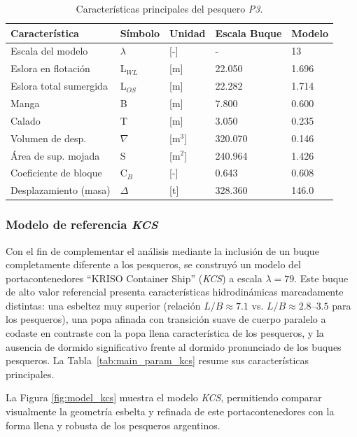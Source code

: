 \begin{table}[htbp]
\centering
\caption{Características principales del pesquero \textit{P3}.}
\label{tab:main_param_p3}
\begin{tabularx}{\textwidth}{lllll}
\toprule
\textbf{Característica}&\textbf{Símbolo}&\textbf{Unidad} & \textbf{Escala Buque} & \textbf{Modelo}\\
\midrule
Escala del modelo & $\lambda$ & {[}-{]} & - & 13 \\
Eslora en flotación & L$_{WL}$ & {[}m{]} & 22.050 & 1.696 \\
Eslora total sumergida & L$_{OS}$ & {[}m{]} & 22.282 & 1.714 \\
Manga & B & {[}m{]} & 7.800 & 0.600 \\
Calado & T & {[}m{]} & 3.050 & 0.235 \\
Volumen de desp. & $\nabla$ & {[}m$^3${]} & 320.070 & 0.146 \\
Área de sup. mojada & S & {[}m$^2${]} & 240.964 & 1.426 \\
Coeficiente de bloque & C$_B$ & {[}-{]} & 0.643 & 0.608 \\
Desplazamiento (masa) & $\Delta$ & {[}t{]} & 328.360 & 146.0 \\
\bottomrule
\end{tabularx}
\end{table}


\subsubsection{Modelo de referencia \textit{KCS}}
Con el fin de complementar el análisis mediante la inclusión de un buque completamente diferente a los pesqueros, se construyó un modelo del portacontenedores ``KRISO Container Ship'' (\textit{KCS}) a escala $\lambda = 79$. Este buque de alto valor referencial presenta características hidrodinámicas marcadamente distintas: una esbeltez muy superior (relación $L/B \approx 7.1$ vs. $L/B \approx 2.8$–$3.5$ para los pesqueros), una popa afinada con transición suave de cuerpo paralelo a codaste en contraste con la popa llena característica de los pesqueros, y la ausencia de dormido significativo frente al dormido pronunciado de los buques pesqueros. La Tabla~\ref{tab:main_param_kcs} resume sus características principales.

La Figura \ref{fig:model_kcs} muestra el modelo \textit{KCS}, permitiendo comparar visualmente la geometría esbelta y refinada de este portacontenedores con la forma llena y robusta de los pesqueros argentinos. 


